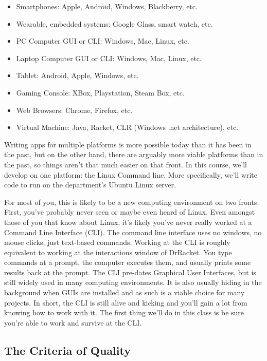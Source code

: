 \documentclass[]{tufte-handout}
\begin{document}
\begin{itemize}
\item Smartphones: Apple, Android, Windows, Blackberry, etc.
\item Wearable, embedded systems: Google Glass, smart watch, etc.
\item PC Computer GUI or CLI: Windows, Mac, Linux, etc.
\item Laptop Computer GUI or CLI: Windows, Mac, Linux, etc.
\item Tablet: Android, Apple, Windows, etc.
\item Gaming Console: XBox, Playstation, Steam Box, etc.
\item Web Browsers: Chrome, Firefox, etc.
\item Virtual Machine: Java, Racket, CLR (Windows .net architecture), etc.
\end{itemize}

Writing apps for multiple platforms is more possible today than it has been in the past, but on the other hand, there are arguably more viable platforms than in the past, so things aren't that much easier on that front.  In this course, we'll develop on one platform: the Linux Command line. More specifically, we'll write code to run on the department's Ubuntu Linux server.  

For most of you, this is likely to be a new computing environment on two fronts.  First, you've probably never seen or maybe even heard of Linux.  Even amongst those of you that know about Linux, it's likely you've never really worked at a Command Line Interface (CLI).  The command line interface uses no windows, no mouse clicks, just text-based commands.  Working at the CLI is roughly equivalent to working at the interactions window of DrRacket. You type commands at a prompt, the computer executes them, and usually prints some results back at the prompt. The CLI pre-dates Graphical User Interfaces, but is still widely used in many computing environments.  It is also usually hiding in the background when GUIs are installed and as such is a viable choice for many projects. In short, the CLI is still alive and kicking and you'll gain a lot from knowing how to work with it.  The first thing we'll do in this class is be sure you're able to work and survive at the CLI.

\subsection{The Criteria of Quality}
\end{document}
